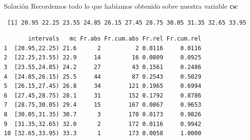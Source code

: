 \documentclass[
  ignorenonframetext,
]{beamer}
\begin{document}
\begin{frame}[fragile]{Solución}
\label{soluciuxf3n-30}
Recordemos todo lo que habíamos obtenido sobre nuestra variable
\texttt{cw}:

\begin{verbatim}
 [1] 20.95 22.25 23.55 24.85 26.15 27.45 28.75 30.05 31.35 32.65 33.95
\end{verbatim}

\begin{verbatim}
       intervals   mc Fr.abs Fr.cum.abs Fr.rel Fr.cum.rel
1  [20.95,22.25) 21.6      2          2 0.0116     0.0116
2  [22.25,23.55) 22.9     14         16 0.0809     0.0925
3  [23.55,24.85) 24.2     27         43 0.1561     0.2486
4  [24.85,26.15) 25.5     44         87 0.2543     0.5029
5  [26.15,27.45) 26.8     34        121 0.1965     0.6994
6  [27.45,28.75) 28.1     31        152 0.1792     0.8786
7  [28.75,30.05) 29.4     15        167 0.0867     0.9653
8  [30.05,31.35) 30.7      3        170 0.0173     0.9826
9  [31.35,32.65) 32.0      2        172 0.0116     0.9942
10 [32.65,33.95) 33.3      1        173 0.0058     1.0000
\end{verbatim}
\end{frame}
\end{document}
